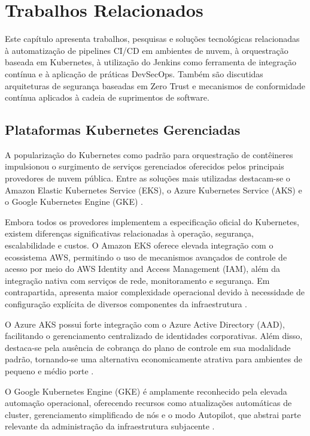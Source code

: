 \chapter{Trabalhos Relacionados}
\label{cap:trabalhos-relacionados}

Este capítulo apresenta trabalhos, pesquisas e soluções tecnológicas relacionadas à automatização de pipelines CI/CD em ambientes de nuvem, à orquestração baseada em Kubernetes, à utilização do Jenkins como ferramenta de integração contínua e à aplicação de práticas DevSecOps. Também são discutidas arquiteturas de segurança baseadas em Zero Trust e mecanismos de conformidade contínua aplicados à cadeia de suprimentos de software.

\section{Plataformas Kubernetes Gerenciadas}
\label{sec:plataformas-kubernetes-gerenciadas}

A popularização do Kubernetes como padrão para orquestração de contêineres impulsionou o surgimento de serviços gerenciados oferecidos pelos principais provedores de nuvem pública. Entre as soluções mais utilizadas destacam-se o Amazon Elastic Kubernetes Service (EKS), o Azure Kubernetes Service (AKS) e o Google Kubernetes Engine (GKE) \cite{cloudsoft2025,naviteq2026}.

Embora todos os provedores implementem a especificação oficial do Kubernetes, existem diferenças significativas relacionadas à operação, segurança, escalabilidade e custos. O Amazon EKS oferece elevada integração com o ecossistema AWS, permitindo o uso de mecanismos avançados de controle de acesso por meio do AWS Identity and Access Management (IAM), além da integração nativa com serviços de rede, monitoramento e segurança. Em contrapartida, apresenta maior complexidade operacional devido à necessidade de configuração explícita de diversos componentes da infraestrutura \cite{cloudsoft2025,tasrie2026}.

O Azure AKS possui forte integração com o Azure Active Directory (AAD), facilitando o gerenciamento centralizado de identidades corporativas. Além disso, destaca-se pela ausência de cobrança do plano de controle em sua modalidade padrão, tornando-se uma alternativa economicamente atrativa para ambientes de pequeno e médio porte \cite{cloudsoft2025,naviteq2026}.

O Google Kubernetes Engine (GKE) é amplamente reconhecido pela elevada automação operacional, oferecendo recursos como atualizações automáticas de cluster, gerenciamento simplificado de nós e o modo Autopilot, que abstrai parte relevante da administração da infraestrutura subjacente \cite{tasrie2026}.

